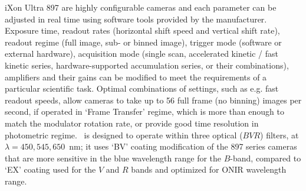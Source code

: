 iXon Ultra 897 are highly configurable cameras and each parameter can be adjusted in real time using software tools provided by the manufacturer.
Exposure time, readout rates (horizontal shift speed and vertical shift rate), readout regime (full image, sub- or binned image), trigger mode (software or external hardware), acquisition mode (single scan, accelerated kinetic / fast kinetic series, hardware-supported accumulation series, or their combinations), amplifiers and their gains can be modified to meet the requirements of a particular scientific task.
Optimal combinations of settings, such as e.g. fast readout speeds, allow cameras to take up to 56 full frame (no binning) images per second, if operated in `Frame Transfer' regime, which is more than enough to match the modulator rotation rate, or provide good time resolution in photometric regime. \DUF\ is designed to operate within three optical ($BVR$) filters, at $\lambda = 450, 545, 650$~nm; it uses `BV' coating modification of the 897 series cameras that are more sensitive in the blue wavelength range for the $B$-band, compared to `EX' coating used for the $V$ and $R$ bands and optimized for \gls{ONIR} wavelength range.




